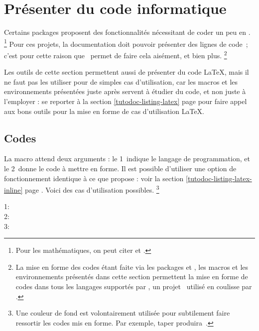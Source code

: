\documentclass{../main/main}
\begin{document}
\section{Présenter du code informatique}

Certains packages proposent des fonctionnalités nécessitant de coder un peu en \lua.%
\footnote{
	Pour les mathématiques, on peut citer  et .
}
Pour ces projets, la documentation doit pouvoir présenter des lignes de code \lua\,; c'est pour cette raison que \thisproj\ permet de faire cela aisément, et bien plus.%
\footnote{
    La mise en forme des codes étant faite via les packages  et , les macros et les environnements présentés dans cette section permettent la mise en forme de codes dans tous les langages supportés par \pygmentsREF, un projet \python\ utilisé en coulisse par .
}


\begin{tdocimp}
	Les outils de cette section permettent aussi de présenter du code \LaTeX, mais il ne faut pas les utiliser pour de simples cas d'utilisation, car les macros et les environnements présentées juste après servent à étudier du code, et non juste à l'employer : se reporter à la section \ref{tutodoc-listing-latex} page \pageref{tutodoc-listing-latex} pour faire appel aux bons outils pour la mise en forme de cas d'utilisation \LaTeX.
\end{tdocimp}



\subsection{Codes }

La macro  attend deux arguments : le 1\ier\ indique le langage de programmation, et le 2\ieme\ donne le code à mettre en forme.
Il est possible d'utiliser une option de fonctionnement identique à ce que propose  : voir la section \ref{tutodoc-listing-latex-inline} page \pageref{tutodoc-listing-latex-inline}.
Voici des cas d'utilisation possibles.%
\footnote{
    Une couleur de fond est volontairement utilisée pour subtilement faire ressortir les codes mis en forme.
    Par exemple, taper  produira \,.
}

\begin{tdoclatex}
1:              \\
2:  \\
3: 
\end{tdoclatex}
\end{document}
